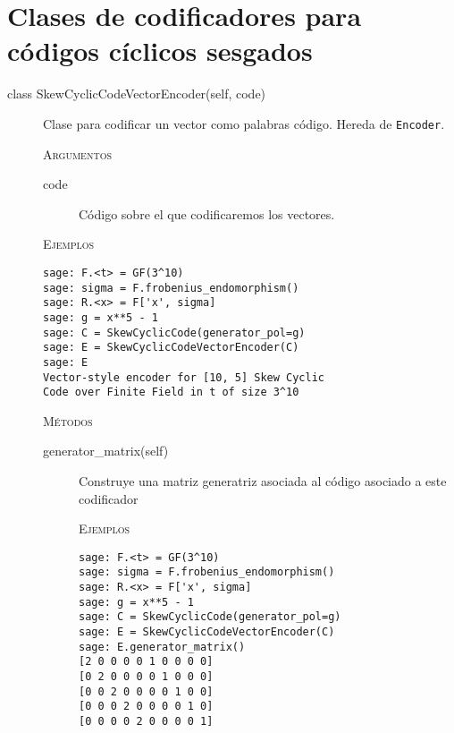 \section{Clases de codificadores para códigos cíclicos sesgados}

\begin{description}
    \item[class SkewCyclicCodeVectorEncoder(self, code)]
    Clase para codificar un vector como palabras código. Hereda de \texttt{Encoder}.

    \textsc{Argumentos}

    \begin{description}
        \item[code]
        Código sobre el que codificaremos los vectores.

    \end{description}

    \textsc{Ejemplos}

    \begin{lstlisting}
sage: F.<t> = GF(3^10)
sage: sigma = F.frobenius_endomorphism()
sage: R.<x> = F['x', sigma]
sage: g = x**5 - 1
sage: C = SkewCyclicCode(generator_pol=g)
sage: E = SkewCyclicCodeVectorEncoder(C)
sage: E
Vector-style encoder for [10, 5] Skew Cyclic
Code over Finite Field in t of size 3^10
    \end{lstlisting}

    \textsc{Métodos}

    \begin{description}
        \item[generator\_matrix(self)]
        Construye una matriz generatriz asociada al código asociado a este codificador

        \textsc{Ejemplos}
    \begin{lstlisting}
sage: F.<t> = GF(3^10)
sage: sigma = F.frobenius_endomorphism()
sage: R.<x> = F['x', sigma]
sage: g = x**5 - 1
sage: C = SkewCyclicCode(generator_pol=g)
sage: E = SkewCyclicCodeVectorEncoder(C)
sage: E.generator_matrix()
[2 0 0 0 0 1 0 0 0 0]
[0 2 0 0 0 0 1 0 0 0]
[0 0 2 0 0 0 0 1 0 0]
[0 0 0 2 0 0 0 0 1 0]
[0 0 0 0 2 0 0 0 0 1]
    \end{lstlisting}
    \end{description}

\end{description}

